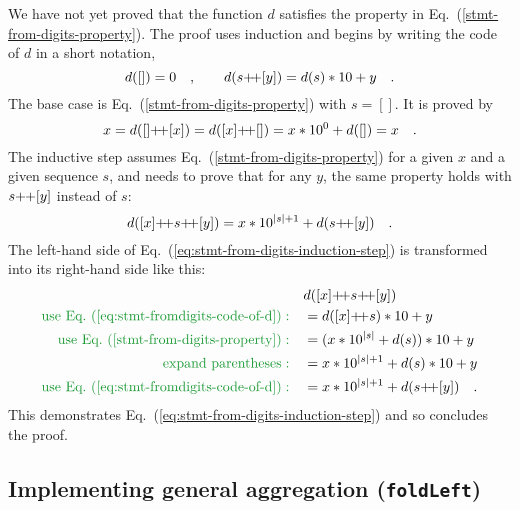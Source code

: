 We have not yet proved that the function $d$ satisfies the property
in Eq.~(\ref{stmt-from-digits-property}). The proof uses induction
and begins by writing the code of $d$ in a short notation,
\begin{equation}
d(\left[\right])=0\quad,\quad\quad d(s{\displaystyle }{+\negmedspace+}[y])=d(s)*10+y\quad.\label{eq:stmt-fromdigits-code-of-d}
\end{equation}
The base case is Eq.~(\ref{stmt-from-digits-property}) with $s=[]$.
It is proved by
\[
x=d([]{\displaystyle }{+\negmedspace+}[x])=d([x]{\displaystyle }{+\negmedspace+}[])=x*10^{0}+d(\left[\right])=x\quad.
\]
The inductive step assumes Eq.~(\ref{stmt-from-digits-property})
for a given $x$ and a given sequence $s$, and needs to prove that
for any $y$, the same property holds with $s\negmedspace+\negthickspace+[y]$
instead of $s$:
\begin{equation}
d([x]{\displaystyle }{+\negmedspace+} s{\displaystyle }{+\negmedspace+}[y])=x*10^{\left|s\right|+1}+d(s{\displaystyle }{+\negmedspace+}[y])\quad.\label{eq:stmt-from-digits-induction-step}
\end{equation}
The left-hand side of Eq.~(\ref{eq:stmt-from-digits-induction-step})
is transformed into its right-hand side like this:
\begin{align*}
 & d([x]\pplus s\pplus[y])\\
{\color{greenunder}\text{use Eq.~(\ref{eq:stmt-fromdigits-code-of-d})}:}\quad & =d([x]\pplus s)*10+y\\
{\color{greenunder}\text{use Eq.~(\ref{stmt-from-digits-property})}:}\quad & =(x*10^{\left|s\right|}+d(s))*10+y\\
{\color{greenunder}\text{expand parentheses}:}\quad & =x*10^{\left|s\right|+1}+d(s)*10+y\\
{\color{greenunder}\text{use Eq.~(\ref{eq:stmt-fromdigits-code-of-d})}:}\quad & =x*10^{\left|s\right|+1}+d(s\pplus[y])\quad.
\end{align*}
This demonstrates Eq.~(\ref{eq:stmt-from-digits-induction-step})
and so concludes the proof.

\subsection{Implementing general aggregation (\texttt{foldLeft})\label{subsec:implementing-general-aggregation-foldleft}}

